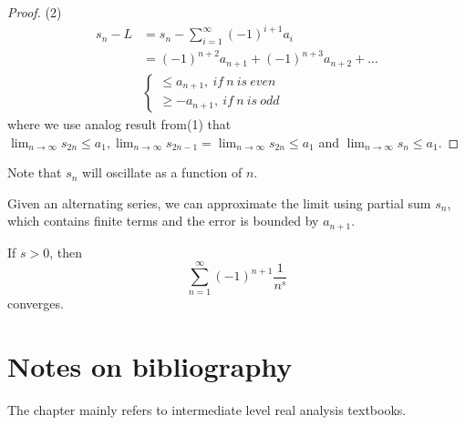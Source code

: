 \begin{refsection}
\begin{proof}
(2) 
\begin{align*}
s_n - L &= s_n - \sum_{i=1}^\infty (-1)^{i+1} a_i \\
&=(-1)^{n+2}a_{n+1} + (-1)^{n+3}a_{n+2} + ...\\
&\begin{cases}
\leq a_{n+1}, ~if~n~is~even\\
\geq -a_{n+1}, ~if~n~is~odd
\end{cases}
\end{align*}
where we use analog result from(1) that $\lim_{n\to \infty} s_{2n} \leq a_1,\lim_{n\to \infty} s_{2n-1} = \lim_{n\to \infty} s_{2n} \leq a_1$ and $\lim_{n\to \infty} s_{n} \leq a_1$.
\end{proof}



\begin{remark}
Note that $s_n$ will oscillate as a function of $n$. 
\end{remark}

\begin{remark}
Given an alternating series, we can approximate the limit using partial sum $s_n$, which contains finite terms and the error is bounded by $a_{n+1}$. 
\end{remark}


\begin{corollary}\cite[25]{johnsonbaugh2010foundations}
If $s>0$, then 
$$\sum_{n=1}^{\infty}(-1)^{n+1} \frac{1}{n^s}$$
converges.
\end{corollary}

\section{Notes on bibliography}
The chapter mainly refers to intermediate level real analysis textbooks\cite{johnsonbaugh2010foundations}\cite{abbott2001understanding}\cite{thomson2001elementary}\cite{strichartz2000way}.

\printbibliography



\end{refsection}
